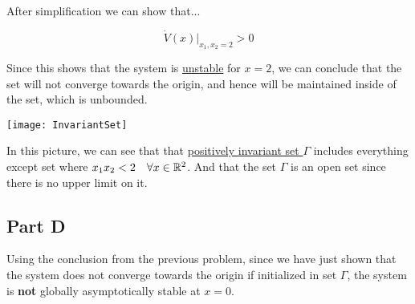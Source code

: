 \noindent After simplification we can show that...


$$
\dot{V}(x) \left. \right\rvert_{x_1,x_2=2} > 0
$$

\noindent Since this shows that the system is \underline{unstable} for $x=2$, we can conclude that the set will not converge towards the origin, and hence will be maintained inside of the set, which is unbounded.


\begin{center}
  \texttt{[image: InvariantSet]}
\end{center}

\noindent In this picture, we can see that that \underline{positively invariant set $\Gamma$} includes everything except set where $x_1x_2 <2 \quad \forall x \in \mathbb{R}^2$. And that the set $\Gamma$ is an open set since there is no upper limit on it.

\subsection*{Part D}

Using the conclusion from the previous problem, since we have just shown that the system does not converge towards the origin if initialized in set $\Gamma$, the system is \textbf{not} globally asymptotically stable at $x=0$.
